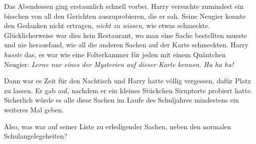 Das Abendessen ging erstaunlich schnell vorbei. Harry versuchte zumindest ein bisschen von all den Gerichten auszuprobieren, die er sah. Seine Neugier konnte den Gedanken nicht ertragen, \emph{nicht zu wissen,} wie etwas schmeckte. Glücklicherweise war dies kein Restaurant, wo man eine Sache bestellten musste und nie herausfand, wie all die anderen Sachen auf der Karte schmeckten. Harry \emph{hasste} das, es war wie eine Folterkammer für jeden mit einem Quäntchen Neugier: \emph{Lerne nur eines der Mysterien auf dieser Karte kennen. Ha ha ha!}

Dann war es Zeit für den Nachtisch und Harry hatte völlig vergessen, dafür Platz zu lassen. Er gab auf, nachdem er ein kleines Stückchen Siruptorte probiert hatte.%
Sicherlich würde es alle diese Sachen im Laufe des Schuljahres mindestens ein weiteres Mal geben.

Also, was war auf seiner Liste zu erledigender Sachen, neben den normalen Schulangelegeheiten?

